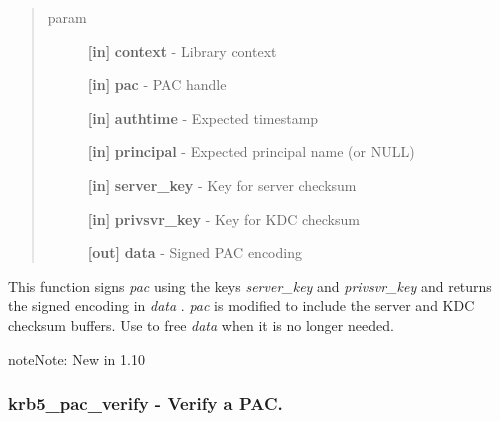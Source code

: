 \documentclass[letterpaper,10pt,english]{sphinxmanual}
\begin{document}
\begin{quote}\begin{description}
\item[{param}] \leavevmode
\textbf{{[}in{]}} \textbf{context} - Library context

\textbf{{[}in{]}} \textbf{pac} - PAC handle

\textbf{{[}in{]}} \textbf{authtime} - Expected timestamp

\textbf{{[}in{]}} \textbf{principal} - Expected principal name (or NULL)

\textbf{{[}in{]}} \textbf{server\_key} - Key for server checksum

\textbf{{[}in{]}} \textbf{privsvr\_key} - Key for KDC checksum

\textbf{{[}out{]}} \textbf{data} - Signed PAC encoding

\end{description}\end{quote}

This function signs \emph{pac} using the keys \emph{server\_key} and \emph{privsvr\_key} and returns the signed encoding in \emph{data} . \emph{pac} is modified to include the server and KDC checksum buffers. Use {\hyperref[appdev/refs/api/krb5_free_data_contents:c.krb5_free_data_contents]{}} to free \emph{data} when it is no longer needed.

\begin{notice}{note}{Note:}
New in 1.10
\end{notice}


\subsubsection{krb5\_pac\_verify -  Verify a PAC.}
\label{appdev/refs/api/krb5_pac_verify::doc}\label{appdev/refs/api/krb5_pac_verify:krb5-pac-verify-verify-a-pac}

\begin{fulllineitems}
\label{appdev/refs/api/krb5_pac_verify:c.krb5_pac_verify}
\end{fulllineitems}
\end{document}
